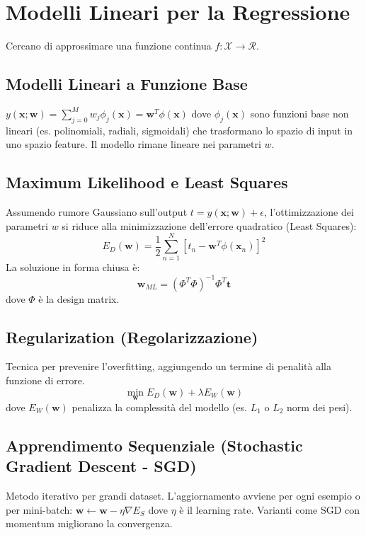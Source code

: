 \documentclass[a4paper,11pt]{article}
\begin{document}
\section{Modelli Lineari per la Regressione}

Cercano di approssimare una funzione continua $f: \mathcal{X} \to \mathcal{R}$.

\subsection{Modelli Lineari a Funzione Base}
$y(\mathbf{x}; \mathbf{w}) = \sum_{j=0}^M w_j \phi_j(\mathbf{x}) = \mathbf{w}^T \phi(\mathbf{x})$
dove $\phi_j(\mathbf{x})$ sono funzioni base non lineari (es. polinomiali, radiali, sigmoidali) che trasformano lo spazio di input in uno spazio feature. Il modello rimane lineare nei parametri $w$.

\subsection{Maximum Likelihood e Least Squares}
Assumendo rumore Gaussiano sull'output $t = y(\mathbf{x}; \mathbf{w}) + \epsilon$, l'ottimizzazione dei parametri $w$ si riduce alla minimizzazione dell'errore quadratico (Least Squares):
\begin{equation}
    E_D(\mathbf{w}) = \frac{1}{2} \sum_{n=1}^N [t_n - \mathbf{w}^T \phi(\mathbf{x}_n)]^2
\end{equation}
La soluzione in forma chiusa è:
\begin{equation}
    \mathbf{w}_{ML} = (\Phi^T \Phi)^{-1} \Phi^T \mathbf{t}
\end{equation}
dove $\Phi$ è la design matrix.

\subsection{Regularization (Regolarizzazione)}
Tecnica per prevenire l'overfitting, aggiungendo un termine di penalità alla funzione di errore.
\begin{equation}
    \min_{\mathbf{w}} E_D(\mathbf{w}) + \lambda E_W(\mathbf{w})
\end{equation}
dove $E_W(\mathbf{w})$ penalizza la complessità del modello (es. $L_1$ o $L_2$ norm dei pesi).

\subsection{Apprendimento Sequenziale (Stochastic Gradient Descent - SGD)}
Metodo iterativo per grandi dataset. L'aggiornamento avviene per ogni esempio o per mini-batch:
$\mathbf{w} \leftarrow \mathbf{w} - \eta \nabla E_S$
dove $\eta$ è il learning rate. Varianti come SGD con momentum migliorano la convergenza.
\end{document}
